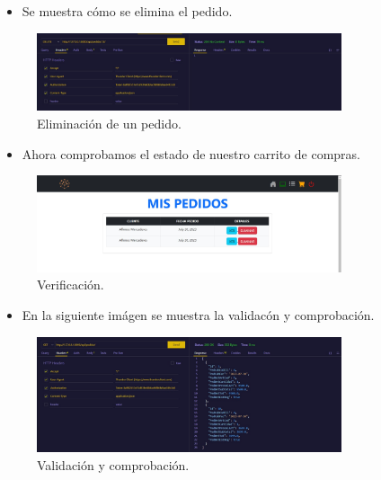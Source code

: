 \documentclass{article}
\begin{document}
    \begin{itemize}
        \item Se muestra cómo se elimina el pedido.
    \end{itemize}
    \begin{figure}[H]
		\centering
        \includegraphics[width=0.8\textwidth,keepaspectratio]{img/b21.jpeg}
		\caption{Eliminación de un pedido.}
    \end{figure}
    \begin{itemize}
        \item Ahora comprobamos el estado de nuestro carrito de compras.
    \end{itemize}
    \begin{figure}[H]
		\centering
        \includegraphics[width=0.8\textwidth,keepaspectratio]{img/b22.jpeg}
		\caption{Verificación.}
    \end{figure}
    \begin{itemize}
        \item En la siguiente imágen se muestra la validacón y comprobación.
    \end{itemize}
    \begin{figure}[H]
		\centering
        \includegraphics[width=0.8\textwidth,keepaspectratio]{img/b23.jpeg}
		\caption{Validación y comprobación.}
    \end{figure}
\end{document}
